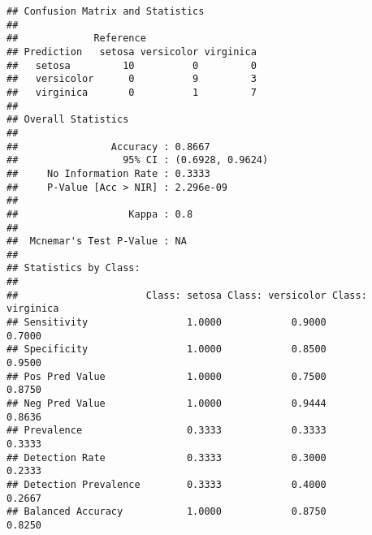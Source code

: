 \documentclass[
]{article}
\newenvironment{Shaded}{\begin{snugshade}}{\end{snugshade}}
\newcommand{\AttributeTok}[1]{\textcolor[rgb]{0.77,0.63,0.00}{#1}}
\newcommand{\CommentTok}[1]{\textcolor[rgb]{0.56,0.35,0.01}{\textit{#1}}}
\newcommand{\FunctionTok}[1]{\textcolor[rgb]{0.00,0.00,0.00}{#1}}
\newcommand{\NormalTok}[1]{#1}
\newcommand{\OtherTok}[1]{\textcolor[rgb]{0.56,0.35,0.01}{#1}}
\newcommand{\SpecialCharTok}[1]{\textcolor[rgb]{0.00,0.00,0.00}{#1}}
\begin{document}
\begin{verbatim}
## Confusion Matrix and Statistics
## 
##             Reference
## Prediction   setosa versicolor virginica
##   setosa         10          0         0
##   versicolor      0          9         3
##   virginica       0          1         7
## 
## Overall Statistics
##                                           
##                Accuracy : 0.8667          
##                  95% CI : (0.6928, 0.9624)
##     No Information Rate : 0.3333          
##     P-Value [Acc > NIR] : 2.296e-09       
##                                           
##                   Kappa : 0.8             
##                                           
##  Mcnemar's Test P-Value : NA              
## 
## Statistics by Class:
## 
##                      Class: setosa Class: versicolor Class: virginica
## Sensitivity                 1.0000            0.9000           0.7000
## Specificity                 1.0000            0.8500           0.9500
## Pos Pred Value              1.0000            0.7500           0.8750
## Neg Pred Value              1.0000            0.9444           0.8636
## Prevalence                  0.3333            0.3333           0.3333
## Detection Rate              0.3333            0.3000           0.2333
## Detection Prevalence        0.3333            0.4000           0.2667
## Balanced Accuracy           1.0000            0.8750           0.8250
\end{verbatim}

\begin{Shaded}
\end{Shaded}
\end{document}
